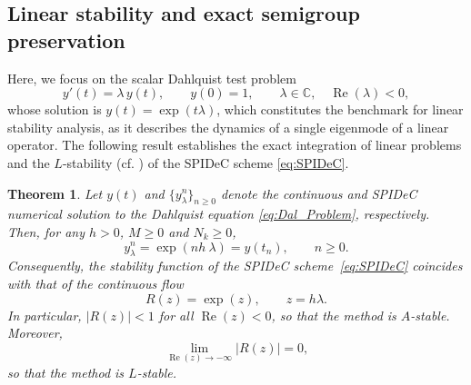 \documentclass[a4paper,num-refs]{oup-contemporary-spidec}
\newtheorem{theorem}{Theorem}[section]
\begin{document}
\subsection{Linear stability and exact semigroup preservation}\label{subsec:LinStab} 

Here, we focus on the scalar Dahlquist test problem
\begin{equation}\label{eq:Dal_Problem}
    y'(t)=\lambda\, y(t),
    \qquad y(0)=1,
    \qquad \lambda\in\mathbb{C},
    \quad \operatorname{Re}(\lambda)<0,
\end{equation}
whose solution is $y(t)=\exp(t \lambda)$, which constitutes the benchmark for linear stability analysis, as it describes the dynamics of a single eigenmode of a linear operator. The following result establishes the exact integration of linear problems and the $L$-stability (cf. \cite[Definition 3.7]{Hairer_1996}) of the SPIDeC scheme \eqref{eq:SPIDeC}.
\begin{theorem}
\label{Thm:Linear_Stability}
    Let $y(t)$ and $\{y_\lambda^n\}_{n\geq 0}$ denote the continuous and SPIDeC numerical solution to the Dahlquist equation \eqref{eq:Dal_Problem}, respectively. Then, for any $h>0$, $M\geq 0$ and $N_k\geq 0$,
    \begin{equation*}
        y_\lambda^n = \exp(nh \ \lambda)=y(t_n),
        \qquad n\geq 0.
    \end{equation*}
    Consequently, the stability function of the SPIDeC 
    scheme~\eqref{eq:SPIDeC} coincides with that of the continuous flow
    \begin{equation*}
        R(z) = \exp(z), \qquad z = h\lambda.
    \end{equation*}
    In particular, $|R(z)|<1$ for all $\operatorname{Re}(z)<0$, 
    so that the method is $A$-stable. Moreover,
    \[
        \lim_{\operatorname{Re}(z)\to-\infty} |R(z)| = 0,
    \]
    so that the method is $L$-stable.
\end{theorem}
\end{document}
